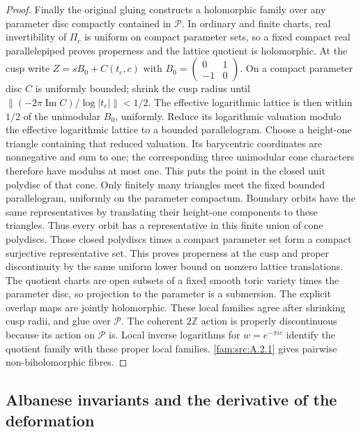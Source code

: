 \begin{proof}
Finally the original gluing constructs a holomorphic family over any parameter disc compactly contained in $\mathcal P$. In ordinary and finite charts, real invertibility of $\Pi_c$ is uniform on compact parameter sets, so a fixed compact real parallelepiped proves properness and the lattice quotient is holomorphic. At the cusp write $Z=sB_0+C(t_c,c)$ with $B_0=\left(\begin{smallmatrix}0&1\\-1&0\end{smallmatrix}\right)$. On a compact parameter disc $C$ is uniformly bounded; shrink the cusp radius until
$\|(-2\pi\operatorname{Im}C)/\log|t_c|\|<1/2$. The effective logarithmic lattice is then within $1/2$ of the unimodular $B_0$, uniformly. Reduce its logarithmic valuation modulo the effective logarithmic lattice to a bounded parallelogram. Choose a height-one triangle containing that reduced valuation. Its barycentric coordinates are nonnegative and sum to one; the corresponding three unimodular cone characters therefore have modulus at most one. This puts the point in the closed unit polydisc of that cone. Only finitely many triangles meet the fixed bounded parallelogram, uniformly on the parameter compactum. Boundary orbits have the same representatives by translating their height-one components to these triangles. Thus every orbit has a representative in this finite union of cone polydiscs. Those closed polydiscs times a compact parameter set form a compact surjective representative set. This proves properness at the cusp and proper discontinuity by the same uniform lower bound on nonzero lattice translations. The quotient charts are open subsets of a fixed smooth toric variety times the parameter disc, so projection to the parameter is a submersion. The explicit overlap maps are jointly holomorphic. These local families agree after shrinking cusp radii, and glue over $\mathcal P$. The coherent $2\mathbb Z$ action is properly discontinuous because its action on $\mathcal P$ is. Local inverse logarithms for $w=e^{-\pi ic}$ identify the quotient family with these proper local families. \ref{fam:src:A.2.1} gives pairwise non-biholomorphic fibres.
\end{proof}

\subsection{Albanese invariants and the derivative of the deformation}\label{fam:section:A.4}

